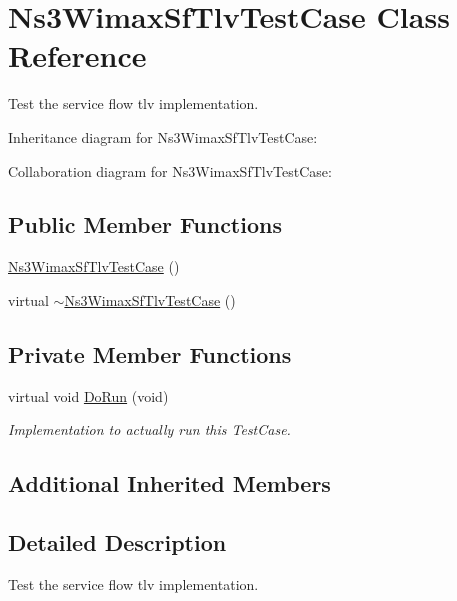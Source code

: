 \hypertarget{classNs3WimaxSfTlvTestCase}{}\section{Ns3\+Wimax\+Sf\+Tlv\+Test\+Case Class Reference}
\label{classNs3WimaxSfTlvTestCase}


Test the service flow tlv implementation.  




Inheritance diagram for Ns3\+Wimax\+Sf\+Tlv\+Test\+Case\+:


Collaboration diagram for Ns3\+Wimax\+Sf\+Tlv\+Test\+Case\+:
\subsection*{Public Member Functions}
\begin{DoxyCompactItemize}
\item 
\hyperlink{classNs3WimaxSfTlvTestCase_adb95d611f298bdf6ca683027b3f4661f}{Ns3\+Wimax\+Sf\+Tlv\+Test\+Case} ()
\item 
virtual \hyperlink{classNs3WimaxSfTlvTestCase_aa5f230edf01b8f029171aef77bd4d167}{$\sim$\+Ns3\+Wimax\+Sf\+Tlv\+Test\+Case} ()
\end{DoxyCompactItemize}
\subsection*{Private Member Functions}
\begin{DoxyCompactItemize}
\item 
virtual void \hyperlink{classNs3WimaxSfTlvTestCase_a7133476eea0e8ec72406f996e5990c68}{Do\+Run} (void)
\begin{DoxyCompactList}\small\item\em Implementation to actually run this Test\+Case. \end{DoxyCompactList}\end{DoxyCompactItemize}
\subsection*{Additional Inherited Members}


\subsection{Detailed Description}
Test the service flow tlv implementation. 

